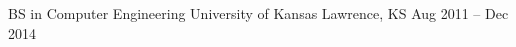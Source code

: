 \begin{cventries}
	\cventry
	{BS in Computer Engineering}
	{University of Kansas}
	{Lawrence, KS}
	{Aug 2011 – Dec 2014}
	{}
\end{cventries}
